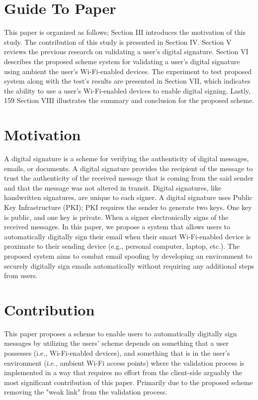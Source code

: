 \documentclass[sigconf]{acmart}
\begin{document}
\section{Guide To Paper}
This paper is organized as follows; Section III introduces the motivation of this study. The contribution of this study is presented in Section IV. Section V reviews the previous research on validating a user's digital signature. Section VI describes the proposed scheme system for validating a user's digital signature using ambient the user's Wi-Fi-enabled devices. The experiment to test proposed system along with the test's results are presented in Section VII, which indicates the ability to use a user's Wi-Fi-enabled devices to enable digital signing. Lastly, 159 Section VIII illustrates the summary and conclusion for the proposed scheme.

\section{Motivation}
A digital signature is a scheme for verifying the authenticity of digital messages, emails, or documents. A digital signature provides the recipient of the message to trust the authenticity of the received message that is coming from the said sender and that the message was not altered in transit. Digital signatures, like handwritten signatures, are unique to each signer. A digital signature uses Public Key Infrastructure (PKI); PKI requires the sender to generate two keys. One key is public, and one key is private. When a signer electronically signs of the received messages. In this paper, we propose a system that allows users to automatically digitally sign their email when their smart Wi-Fi-enabled device is proximate to their sending device (e.g., personal computer, laptop, etc.). The proposed system aims to combat email spooﬁng by developing an environment to securely digitally sign emails automatically without requiring any additional steps from users.

\section{Contribution}
This paper proposes a scheme to enable users to automatically digitally sign messages by utilizing the users' scheme depends on something that a user possesses (i.e., Wi-Fi-enabled devices), and something that is in the user's environment (i.e., ambient Wi-Fi access points) where the validation process is implemented in a way that requires no effort from the client-side arguably the most signiﬁcant contribution of this paper. Primarily due to the proposed scheme removing the "weak link" from the validation process.
\end{document}
